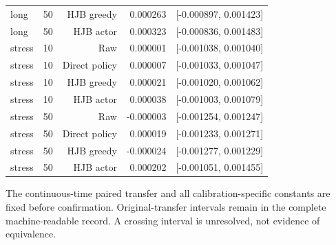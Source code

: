 \begin{longtable}{lrrrr}
long & 50 & HJB greedy & 0.000263 & [-0.000897, 0.001423] \\
long & 50 & HJB actor & 0.000323 & [-0.000836, 0.001483] \\
stress & 10 & Raw & 0.000001 & [-0.001038, 0.001040] \\
stress & 10 & Direct policy & 0.000007 & [-0.001033, 0.001047] \\
stress & 10 & HJB greedy & 0.000021 & [-0.001020, 0.001062] \\
stress & 10 & HJB actor & 0.000038 & [-0.001003, 0.001079] \\
stress & 50 & Raw & -0.000003 & [-0.001254, 0.001247] \\
stress & 50 & Direct policy & 0.000019 & [-0.001233, 0.001271] \\
stress & 50 & HJB greedy & -0.000024 & [-0.001277, 0.001229] \\
stress & 50 & HJB actor & 0.000202 & [-0.001051, 0.001455] \\
\bottomrule
\end{longtable}
\par\medskip\noindent\footnotesize The continuous-time paired transfer and all calibration-specific constants are fixed before confirmation. Original-transfer intervals remain in the complete machine-readable record. A crossing interval is unresolved, not evidence of equivalence.
\endgroup
